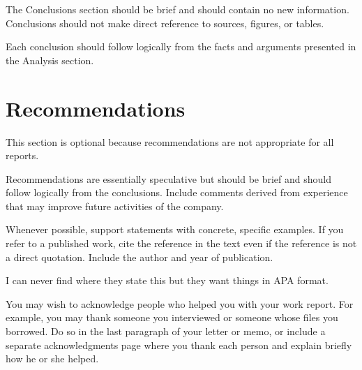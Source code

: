 \documentclass[12pt]{article}
\begin{document}
The Conclusions section should be brief and should contain no new information. Conclusions should not make direct reference to sources, figures, or tables.

Each conclusion should follow logically from the facts and arguments presented in the Analysis section.

\newpage
\section{Recommendations}


This section is optional because recommendations are not appropriate for all reports. 

Recommendations are essentially speculative but should be brief and should follow logically from the conclusions. Include comments derived from experience that may improve future activities of the company.




Whenever possible, support statements with concrete, specific examples. If you refer to a published work, cite the reference in the text even if the reference is not a direct quotation. Include the author and year of publication.

I can never find where they state this but they want things in APA format. 





You may wish to acknowledge people who helped you with your work report. For example, you may thank someone you interviewed or someone whose files you borrowed. Do so in the last paragraph of your letter or memo, or include a separate acknowledgments page where you thank each person and explain briefly how he or she helped.
\end{document}

